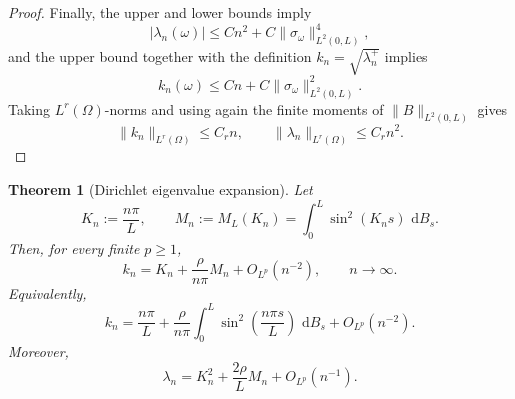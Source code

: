 \documentclass[11pt]{article}
\newtheorem{theorem}{Theorem}[section]
\newcommand{\dd}{\,\mathrm d}
\begin{document}
\begin{proof}
Finally, the upper and lower bounds imply
\[
    |\lambda_n(\omega)|\le Cn^2+C\|\sigma_\omega\|_{L^2(0,L)}^4 ,
\]
and the upper bound together with the definition \(k_n=\sqrt{\lambda_n^+}\) implies
\[
    k_n(\omega)\le Cn+C\|\sigma_\omega\|_{L^2(0,L)}^2 .
\]
Taking \(L^r(\Omega)\)-norms and using again the finite moments of \(\|B\|_{L^2(0,L)}\) gives
\[
    \|k_n\|_{L^r(\Omega)}\le C_r n,
    \qquad
    \|\lambda_n\|_{L^r(\Omega)}\le C_r n^2 .
\]
\end{proof}

\begin{theorem}[Dirichlet eigenvalue expansion]\label{thm:eigenvalue-asymptotics}
Let
\[
    K_n:=\frac{n\pi}{L},
    \qquad
    M_n:=M_L(K_n)
    =
    \int_0^L
    \sin^2(K_ns)\,\dd B_s .
\]
Then, for every finite \(p\ge1\),
\[
    k_n
    =
    K_n+\frac{\rho}{n\pi}M_n+O_{L^p}(n^{-2}),
    \qquad n\to\infty.
\]
Equivalently,
\[
    k_n
    =
    \frac{n\pi}{L}
    +
    \frac{\rho}{n\pi}
    \int_0^L
    \sin^2\left(\frac{n\pi s}{L}\right)\,\dd B_s
    +
    O_{L^p}(n^{-2}).
\]
Moreover,
\[
    \lambda_n
    =
    K_n^2+\frac{2\rho}{L}M_n+O_{L^p}(n^{-1}).
\]
\end{theorem}
\end{document}
